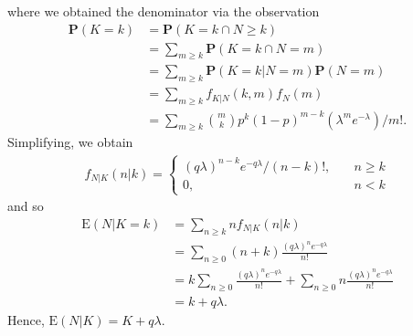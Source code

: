 where we obtained the denominator via the observation
\begin{align*}
	\mathbf{P}(K = k) & = \mathbf{P}(K = k \cap N \ge k) 
	\\
	& = \sum_{m \ge k} \mathbf{P}(K =
	k \cap N = m) 
	\\
	& = \sum_{m \ge k} \mathbf{P}(K = k | N = m) \mathbf{P}(N = m)
	\\
	& = \sum_{m \ge k} f_{K|N}(k, m) f_N(m)
	\\
	& = \sum_{m \ge k}
	\binom{m}{k} p^k {(1 - p)}^{m-k} (\lambda^m e^{-\lambda})/m!.
\end{align*}
Simplifying, we obtain
\begin{align*}
	f_{N|K}(n|k) = 
	\begin{cases}
		{(q\lambda)}^{n-k} e^{-q\lambda}/(n-k)!, \quad & n \ge k
		\\
		0, \quad & n<k
	\end{cases}
\end{align*}
and so 
\begin{align*}
	\mathrm{E}(N | K = k) & = \sum_{n \ge k} n f_{N|K}(n | k)
	\\
	& = \sum_{n \ge 0} (n + k) \frac{{(q \lambda)}^n e^{-q\lambda}}{n!}
	\\
	& = k \sum_{n \ge 0} \frac{{(q \lambda)}^n e^{-q\lambda}}{n!} + \sum_{n \ge 
	0}
	n \frac{{(q\lambda)}^n e^{-q\lambda}}{n!} 
	\\
	& = k + q\lambda.
\end{align*}
Hence, $\mathrm{E}(N|K) = K + q \lambda$.
